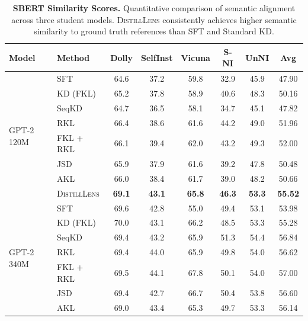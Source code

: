 \begin{table}[!t]
    \centering
    \small
    \caption{\textbf{SBERT Similarity Scores.} Quantitative comparison of semantic alignment across three student models. \textsc{DistillLens} consistently achieves higher semantic similarity to ground truth references than SFT and Standard KD.}
    \begin{tabular}{ll|c|c|c|c|c||c}
    \toprule
    \textbf{Model} & \textbf{Method}
    & \textbf{Dolly} & \textbf{SelfInst}  & \textbf{Vicuna} & \textbf{S-NI} & \textbf{UnNI} & \textbf{Avg}\\
     \midrule
    \multirow{8}{*}{GPT-2 120M}
        & SFT & 64.6 & 37.2 & 59.8 & 32.9 & 45.9 & 47.90 \\
     & KD (FKL) &  65.2 & 37.8 & 58.9 & 40.6 & 48.3  & 50.16  \\
     & SeqKD &  64.7 & 36.5 & 58.1 & 34.7 & 45.1 & 47.82 \\
     & RKL & 66.4 & 38.6 & 61.6 & 44.2 & 49.0 & 51.96 \\
     & FKL + RKL & 66.1 & 39.4 & 62.0 & 43.2 & 49.3 & 52.00 \\
     & JSD & 65.9 & 37.9 & 61.6 & 39.2 & 47.8 & 50.48 \\
     & AKL & 66.0 & 38.4 & 61.7 & 39.0 &  48.2 & 50.66 \\
     & \textsc{DistillLens} & \textbf{69.1} & \textbf{43.1} & \textbf{65.8} & \textbf{46.3} & \textbf{53.3} & \textbf{55.52} \\
     \midrule
    \multirow{8}{*}{GPT-2 340M}
        & SFT & 69.6 & 42.8 & 55.0 & 49.4 & 53.1 & 53.98 \\
     & KD (FKL)  & 70.0 & 43.1 & 66.2 & 48.5 & 53.3 & 55.28 \\
     & SeqKD & 69.4 & 43.2 & 65.9 & 51.3 & 54.4 & 56.84 \\
     & RKL & 69.4 & 44.0 & 65.9 & 49.8 & 54.0 & 56.62\\
     & FKL + RKL & 69.5 & 44.1 & 67.8 & 50.1 & 54.0 & 57.00 \\
     & JSD & 69.4 & 42.7 & 66.7 & 50.4 & 53.8 & 56.60 \\
     & AKL & 69.0 & 43.4 & 65.3 & 49.7 &  53.3 & 56.14 \\

\end{tabular}
\end{table}
